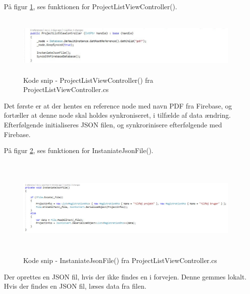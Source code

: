 På figur \ref{fig:ProjectListViewController}, ses funktionen for ProjectListViewController().
\begin{figure}[H] %
	\centering
	\includegraphics[height=3cm, width=17cm]{../ArkitekturDesign/Design/ProjectList/ProjectListViewController}
	\caption{Kode snip - ProjectListViewController() fra ProjectListViewController.cs}
	\label{fig:ProjectListViewController}
\end{figure}
Det første er at der hentes en reference node med navn PDF fra Firebase, og fortæller at denne node skal holdes synkroniseret, i tilfælde af data ændring. \\
Efterfølgende initialiseres JSON filen, og synkrorinisere efterfølgende med Firebase.

På figur \ref{fig:JSONFile}, ses funktionen for InstaniateJsonFile().
\begin{figure}[H] %
	\centering
	\includegraphics[height=5cm, width=15cm]{../ArkitekturDesign/Design/ProjectList/JSONFile}
	\caption{Kode snip - InstaniateJsonFile() fra ProjectListViewController.cs}
	\label{fig:JSONFile}
\end{figure}
Der oprettes en JSON fil, hvis der ikke findes en i forvejen. Denne gemmes lokalt.\\
Hvis der findes en JSON fil, læses data fra filen.

\clearpage

